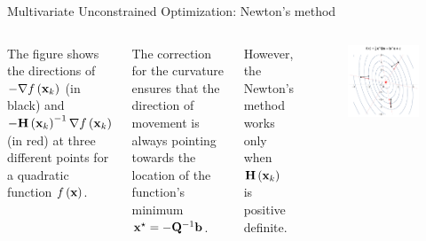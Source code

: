 \documentclass[aspectratio=169]{beamer}
\def\mf{\ensuremath\mathbf}
\def\lp{\ensuremath\left(}
\def\rp{\ensuremath\right)}
\newcommand{\ct}[1]{\lp #1\rp}
\begin{document}
\begin{frame}{Multivariate Unconstrained Optimization: Newton's method}
  \begin{columns}
    The figure shows the directions of $-\nabla f\ct{\mf{x}_k}$ (in black) and $-\mf{H}\ct{\mf{x}_k}^{-1}\nabla f\ct{\mf{x}_k}$ (in red) at three different points for a quadratic function $f\ct{\mf{x}}$.
    \vspace{0.2cm}

    The correction for the curvature ensures that the direction of movement is always pointing towards the location of the function's minimum $\mf{x}^\star = -\mf{Q}^{-1}\mf{b}$. 
    \vspace{0.2cm}

    However, the Newton's method works only when $\mf{H}\ct{\mf{x}_k}$ is positive definite.
    
    \begin{figure}
      \centering
      \includegraphics[width=1\textwidth]{figs/newton_vs_gradient_descent.pdf}
    \end{figure}
  \end{columns}
\end{frame}
\end{document}
